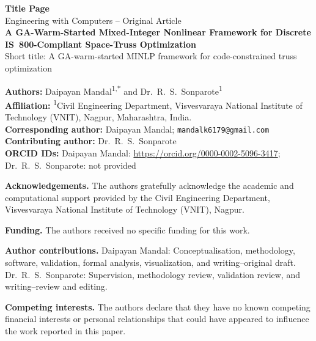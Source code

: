 \documentclass[10pt]{article}
\begin{document}
\begin{titlepage}
\thispagestyle{empty}
\small
\begin{center}
{\Large\bfseries Title Page}\\[0.7em]
{Engineering with Computers -- Original Article}\\[1.0em]
{\LARGE\bfseries A GA-Warm-Started Mixed-Integer Nonlinear Framework for Discrete IS~800-Compliant Space-Truss Optimization}\\[0.5em]
{\footnotesize Short title: A GA-warm-started MINLP framework for code-constrained truss optimization}
\end{center}

\vspace{0.7em}
\noindent\textbf{Authors:} Daipayan Mandal\textsuperscript{1,*} and Dr.~R.~S.~Sonparote\textsuperscript{1}\\
\textbf{Affiliation:} \textsuperscript{1}Civil Engineering Department, Visvesvaraya National Institute of Technology (VNIT), Nagpur, Maharashtra, India.\\
\textbf{Corresponding author:} Daipayan Mandal; \texttt{mandalk6179@gmail.com}\\
\textbf{Contributing author:} Dr.~R.~S.~Sonparote\\
\textbf{ORCID IDs:} Daipayan Mandal: \url{https://orcid.org/0000-0002-5096-3417}; Dr.~R.~S.~Sonparote: not provided

\vspace{0.7em}
\noindent\textbf{Acknowledgements.} The authors gratefully acknowledge the academic and computational support provided by the Civil Engineering Department, Visvesvaraya National Institute of Technology (VNIT), Nagpur.

\vspace{0.45em}
\noindent\textbf{Funding.} The authors received no specific funding for this work.

\vspace{0.45em}
\noindent\textbf{Author contributions.} Daipayan Mandal: Conceptualisation, methodology, software, validation, formal analysis, visualization, and writing--original draft. Dr.~R.~S.~Sonparote: Supervision, methodology review, validation review, and writing--review and editing.

\vspace{0.45em}
\noindent\textbf{Competing interests.} The authors declare that they have no known competing financial interests or personal relationships that could have appeared to influence the work reported in this paper.


\end{titlepage}
\end{document}

